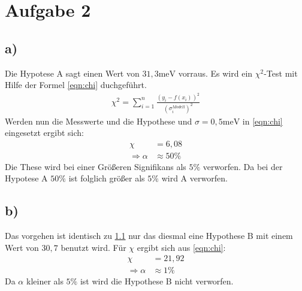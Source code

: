 \newpage
\section{Aufgabe 2}

\subsection{a)}
\label{sec:A2a}
Die Hypotese A sagt einen Wert von $31,3\si{\milli\electronvolt}$
vorraus.
Es wird ein $\chi^2$-Test mit Hilfe der Formel \ref{eqn:chi}
duchgeführt.
\begin{align}
  \chi^2=\sum_{i=1}^n\frac{(y_i-f(x_i))^2}{(\sigma_i^{Modell})^2}\label{eqn:chi}
\end{align}
Werden nun die Messwerte und die Hypothese und $\sigma=0,5\si{\milli\electronvolt}$ in \eqref{eqn:chi} eingesetzt ergibt sich:
\begin{align}
  \chi&=6,08 \\
  \Rightarrow \alpha&\approx50\%
\end{align}
Die These wird bei
einer Größeren Signifikans als $5\%$ verworfen.
Da \alpha bei der Hypotese A $50\%$ ist folglich größer als $5\%$ wird A verworfen.
\subsection{b)}
Das vorgehen ist identisch zu \ref{sec:A2a} nur
das diesmal eine Hypothese B mit einem Wert von $30,7$
benutzt wird.
Für $\chi$ ergibt sich aus \eqref{eqn:chi}:
\begin{align}
  \chi&=21,92 \\
  \Rightarrow \alpha&\approx 1\%
\end{align}
Da $\alpha$ kleiner als $5\%$ ist wird die Hypothese B nicht verworfen.
